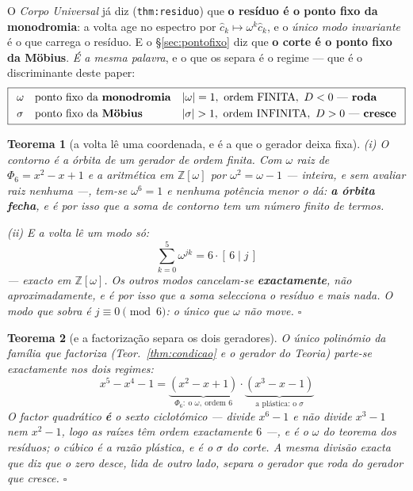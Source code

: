 \documentclass[11pt,a4paper]{article}
\newtheorem{teorema}{Teorema}
\newcommand{\code}[1]{\texttt{\small #1}}
\newcommand{\abs}[1]{\lvert #1\rvert}
\begin{document}
\noindent O \emph{Corpo Universal} já diz (\code{thm:residuo}) que \textbf{o resíduo é
o ponto fixo da monodromia}: a volta age no espectro por
$\hat c_k\mapsto\omega^{k}\hat c_k$, e o \emph{único modo invariante} é o que carrega
o resíduo. E o \S\ref{sec:pontofixo} diz que \textbf{o corte é o ponto fixo da
Möbius}. \emph{É a mesma palavra}, e o que os separa é o regime --- que é o
discriminante deste paper:
\[
\boxed{
\begin{array}{lll}
\omega & \text{ponto fixo da \textbf{monodromia}} & \abs{\omega}=1,\ \text{ordem
FINITA},\ D<0\ \text{--- \textbf{roda}}\\[3pt]
\sigma & \text{ponto fixo da \textbf{Möbius}} & \abs{\sigma}>1,\ \text{ordem
INFINITA},\ D>0\ \text{--- \textbf{cresce}}
\end{array}}
\]

\begin{teorema}[a volta lê uma coordenada, e é a que o gerador deixa fixa]\label{thm:residuo-geo}
\emph{(i) O contorno é a órbita de um gerador de ordem finita.} Com
$\omega$ raiz de $\Phi_6=x^{2}-x+1$ e a aritmética em $\mathbb{Z}[\omega]$ por
$\omega^{2}=\omega-1$ --- \emph{inteira, e sem avaliar raiz nenhuma} ---, tem-se
$\omega^{6}=1$ e nenhuma potência menor o dá: \textbf{a órbita fecha}, e é por isso
que a soma de contorno tem um número finito de termos.

\emph{(ii) E a volta lê um modo só:}
\[
\boxed{\;\sum_{k=0}^{5}\omega^{jk}=6\cdot[\,6\mid j\,]\;}
\]
--- exacto em $\mathbb{Z}[\omega]$. Os outros modos cancelam-se
\textbf{exactamente}, não aproximadamente, e é por isso que a soma selecciona o
resíduo e mais nada. O modo que sobra é $j\equiv0\pmod 6$: \emph{o único que
$\omega$ não move}. $\square$
\end{teorema}

\begin{teorema}[e a factorização separa os dois geradores]\label{thm:separa}
O único polinómio da família que factoriza (Teor.~\ref{thm:condicao} e o
\emph{gerador} do \emph{Teoria}) parte-se exactamente nos dois regimes:
\[
\boxed{\;x^{5}-x^{4}-1=\underbrace{(x^{2}-x+1)}_{\Phi_6:\ \text{o }\omega,\ \text{ordem }6}
\cdot\underbrace{(x^{3}-x-1)}_{\text{a plástica: o }\sigma}\;}
\]
O factor quadrático \textbf{é} o sexto ciclotómico --- divide $x^{6}-1$ e \emph{não}
divide $x^{3}-1$ nem $x^{2}-1$, logo as raízes têm ordem exactamente $6$ ---, e é o
$\omega$ do teorema dos resíduos; o cúbico é a razão plástica, e é o $\sigma$ do
corte. \emph{A mesma divisão exacta que diz que o zero desce, lida de outro lado,
separa o gerador que roda do gerador que cresce.} $\square$
\end{teorema}
\end{document}
